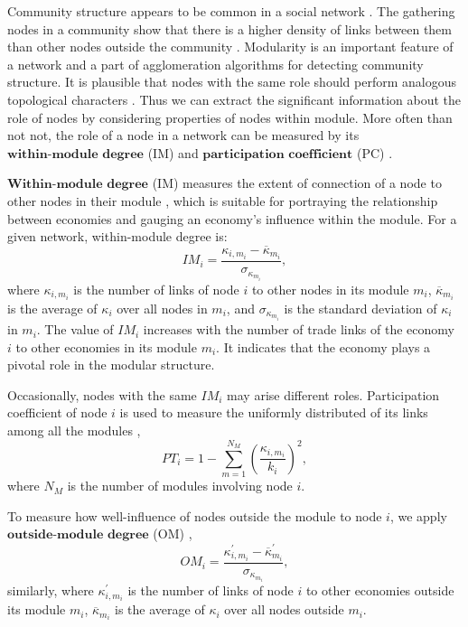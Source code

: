 \documentclass[preprint,3p,times,sort&compress]{elsarticle}
\begin{document}
Community structure appears to be common in a social network \cite{Girvan-Newman-2002-ProcNatlAcadSciUSA}. The gathering nodes in a community show that there is a higher density of links between them than other nodes outside the community \cite{Clauset-Newman-Moore-2004-PhysRevE}. Modularity is an important feature of a network and a part of agglomeration algorithms for detecting community structure. It is plausible that nodes with the same role should perform analogous topological characters \cite{Guimera-Amaral-2005-Nature}. Thus we can extract the significant information about the role of nodes by considering properties of nodes within module. More often than not not, the role of a node in a network can be measured by its $\textbf{within-module degree}$ (IM) and $\textbf{participation coefficient}$ (PC) \cite{Guimera-Amaral-2005-Nature}. 

$\textbf{Within-module degree}$ (IM) measures the extent of connection of a node to other nodes in their module \cite{Guimera-Amaral-2005-Nature}, which is suitable for portraying the relationship between economies and gauging an economy's influence within the module. For a given network, within-module degree is:
\begin{equation}
IM_{i}=\frac{\kappa_{i,m_i}-\overline{\kappa}_{m_i}}{\sigma_{\kappa_{m_i}}},
\label{Eq:module:within}
\end{equation}
where $\kappa_{i,m_i}$ is the number of links of node $i$ to other nodes in its module $m_i$, $\overline{\kappa}_{m_i}$ is the average of $\kappa_i$ over all nodes in $m_i$, and $\sigma_{\kappa_{m_i}}$ is the standard deviation of $\kappa_{i}$ in $m_i$. The value of $IM_{i}$ increases with the number of trade links of the economy $i$ to other economies in its module $m_i$. It indicates that the economy plays a pivotal role in the modular structure. 



Occasionally, nodes with the same $IM_{i}$ may arise different roles. Participation coefficient of node $i$ is used to measure the uniformly distributed of its links among all the modules \cite{Guimera-Amaral-2005-Nature},
\begin{equation}
PT_{i}=1-\sum_{m=1}^{N_{M}}\left(\frac{\kappa_{i,m_i}}{k_{i}}\right)^{2},
\label{Eq:module:participant}
\end{equation}
where $N_{M}$ is the number of modules involving node $i$.


To measure how well-influence of nodes outside the module to node $i$, we apply $\textbf{outside-module degree}$ (OM) \cite{Xu-Pan-Muscoloni-Xia-Cannistraci-2020-NatCommun},
\begin{equation}
OM_{i}=\frac{\kappa_{i,m_i}^{'}-\overline{\kappa}^{'}_{m_i}}{\sigma_{\kappa_{m_i}}},
\label{Eq:module:outside}
\end{equation} 
similarly, where $\kappa_{i,m_i}^{'}$ is the number of links of node $i$ to other economies outside its module $m_i$, $\overline{\kappa}_{m_i}$ is the average of $\kappa_i$ over all nodes outside $m_i$.
\end{document}

